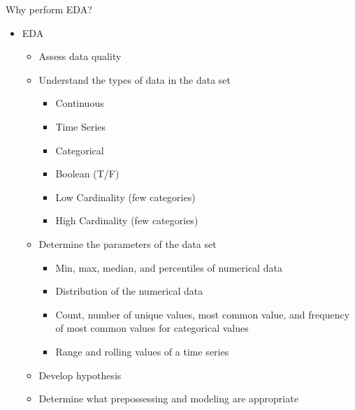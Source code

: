\documentclass[10pt]{beamer}
\begin{document}
\begin{frame}{Why perform EDA?}  
	\begin{itemize}
		\item EDA
			\begin{itemize}
			    \pause
				\item Assess data quality
				\pause
				\item Understand the types of data in the data set
					\begin{itemize}
						\item Continuous
						\item Time Series
						\item Categorical
						\item Boolean (T/F)
						\item Low Cardinality (few categories)
						\item High Cardinality (few categories)
					\end{itemize}
				\pause
				\item Determine the parameters of the data set
					\begin{itemize}
						\item Min, max, median, and percentiles of numerical data
						\item Distribution of the numerical data
						\item Count, number of unique values, most common value, and frequency of most common values for categorical values
						\item Range and rolling values of a time series
					\end{itemize}
				\pause
				\item Develop hypothesis
				\pause
				\item Determine what prepossessing and modeling are appropriate
			\end{itemize}
	\end{itemize}
\end{frame}
\end{document}
